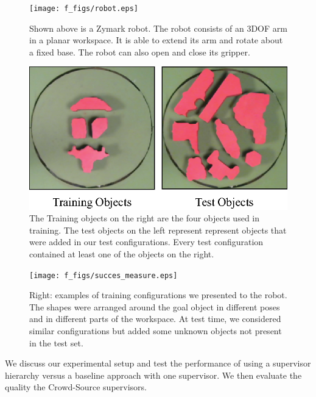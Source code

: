 \documentclass[10pt, conference]{ieeeconf}      %
\begin{document}
\begin{figure}[t]
\centering

\texttt{[image: f\_figs/robot.eps]}

\caption{\footnotesize  Shown above is a Zymark robot. The robot consists of an 3DOF arm in a planar workspace. It is able to extend its arm and rotate about a fixed base. The robot can also open and close its gripper.}

\label{fig:robot}
\end{figure}

\begin{figure}[t]
\centering
\includegraphics{f_figs/shapes_set.eps}

\caption{\footnotesize  The Training objects on the right are the four objects used in training. The test objects on the
left represent represent objects that were added in our test configurations. Every test configuration contained at least
one of the objects on the right.}

\label{fig:shape_set}
\end{figure}


\begin{figure}[t]
\centering
\texttt{[image: f\_figs/succes\_measure.eps]}

\caption{\footnotesize  Right: examples of training configurations we presented to the robot. The shapes were arranged
around the goal object in different poses and in different parts of the workspace. At test time, we considered similar configurations but 
added some unknown objects not present in the test set. }
\vspace*{-20pt}
\label{fig:suc_meas}
\end{figure}

We discuss our experimental setup and test the performance of using a supervisor hierarchy versus a baseline approach
with one supervisor. We then evaluate the quality the Crowd-Source supervisors. 
\end{document}
